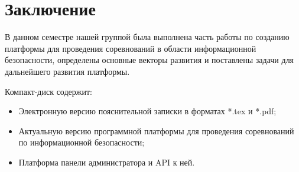 \newpage
\section*{Заключение}
В данном семестре нашей группой была выполнена часть работы по созданию платформы для проведения соревнований в области информационной безопасности, определены основные векторы развития и поставлены задачи для дальнейшего развития платформы.

\newpage
\renewcommand{\refname}{Список использованных источников}


Компакт-диск содержит: 
\begin{itemize}
\item Электронную версию пояснительной записки в форматах *.tex и *.pdf;
\item Актуальную версию программной платформы для проведения соревнований по информационной безопасности;
\item Платформа панели администратора и API к ней.
\end{itemize}
 

